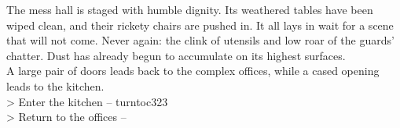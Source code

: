 The mess hall is staged with humble dignity. Its weathered tables have been wiped clean, and their rickety chairs are pushed in. It all lays in wait for a scene that will not come. Never again: the clink of utensils and low roar of the guards' chatter. Dust has already begun to accumulate on its highest surfaces.\\

A large pair of doors leads back to the complex offices, while a cased opening leads to the kitchen.\\

> Enter the kitchen -- turnto{c323}\\
> Return to the offices -- 